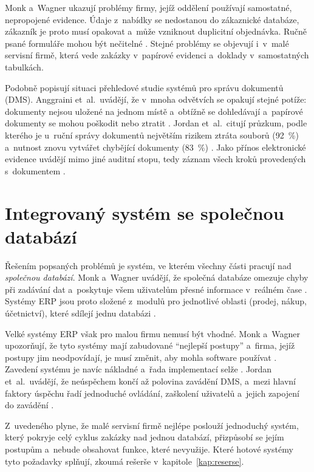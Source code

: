 Monk a~Wagner ukazují problémy firmy, jejíž oddělení používají samostatné, nepropojené evidence. Údaje z~nabídky se nedostanou do zákaznické databáze, zákazník je proto musí opakovat a~může vzniknout duplicitní objednávka. Ručně psané formuláře mohou být nečitelné \cite[s.~53]{MonkWagner2013}. Stejné problémy se objevují i~v~malé servisní firmě, která vede zakázky v~papírové evidenci a~doklady v~samostatných tabulkách.

Podobně popisují situaci přehledové studie systémů pro správu dokumentů (DMS). Anggraini et~al.\ uvádějí, že v~mnoha odvětvích se opakují stejné potíže: dokumenty nejsou uložené na jednom místě a~obtížně se dohledávají a~papírové dokumenty se mohou poškodit nebo ztratit \cite[s.~264]{Anggraini2024}. Jordan et~al.\ citují průzkum, podle kterého je u~ruční správy dokumentů největším rizikem ztráta souborů (92~\%) a~nutnost znovu vytvářet chybějící dokumenty (83~\%) \cite[s.~46]{Jordan2022}. Jako přínos elektronické evidence uvádějí mimo jiné auditní stopu, tedy záznam všech kroků provedených s~dokumentem \cite[s.~46]{Jordan2022}.

\section{Integrovaný systém se společnou databází}\label{sec:zakazka-integrace}

Řešením popsaných problémů je systém, ve kterém všechny části pracují nad \emph{společnou databází}. Monk a~Wagner uvádějí, že společná databáze omezuje chyby při zadávání dat a~poskytuje všem uživatelům přesné informace v~reálném čase \cite[s.~56]{MonkWagner2013}. Systémy ERP jsou proto složené z~modulů pro jednotlivé oblasti (prodej, nákup, účetnictví), které sdílejí jednu databázi \cite[s.~29--31]{MonkWagner2013}.

Velké systémy ERP však pro malou firmu nemusí být vhodné. Monk a~Wagner upozorňují, že tyto systémy mají zabudované \enquote{nejlepší postupy} a~firma, jejíž postupy jim neodpovídají, je musí změnit, aby mohla software používat \cite[s.~34]{MonkWagner2013}. Zavedení systému je navíc nákladné a~řada implementací selže \cite[s.~40]{MonkWagner2013}. Jordan et~al.\ uvádějí, že neúspěchem končí až polovina zavádění DMS, a~mezi hlavní faktory úspěchu řadí jednoduché ovládání, zaškolení uživatelů a~jejich zapojení do zavádění \cite[s.~46, 48]{Jordan2022}.

Z~uvedeného plyne, že malé servisní firmě nejlépe poslouží jednoduchý systém, který pokryje celý cyklus zakázky nad jednou databází, přizpůsobí se jejím postupům a~nebude obsahovat funkce, které nevyužije. Které hotové systémy tyto požadavky splňují, zkoumá rešerše v~kapitole~\ref{kap:reserse}.
